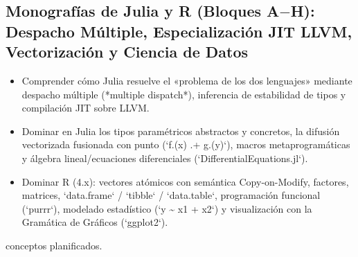 \documentclass{book}
\begin{document}
\subsection*{\checkmark Monografías de Julia y R (Bloques A\(-\)H): Despacho Múltiple, Especialización JIT LLVM, Vectorización y Ciencia de Datos}
\begin{itemize}
\item Comprender cómo Julia resuelve el «problema de los dos lenguajes» mediante despacho múltiple (*multiple dispatch*), inferencia de estabilidad de tipos y compilación JIT sobre LLVM.
\item Dominar en Julia los tipos paramétricos abstractos y concretos, la difusión vectorizada fusionada con punto (`f.(x) .+ g.(y)`), macros metaprogramáticas y álgebra lineal/ecuaciones diferenciales (`DifferentialEquations.jl`).
\item Dominar R (4.x): vectores atómicos con semántica Copy-on-Modify, factores, matrices, `data.frame` / `tibble` / `data.table`, programación funcional (`purrr`), modelado estadístico (`y \textasciitilde{} x1 + x2`) y visualización con la Gramática de Gráficos (`ggplot2`).
\end{itemize}
 conceptos planificados.
\end{document}
